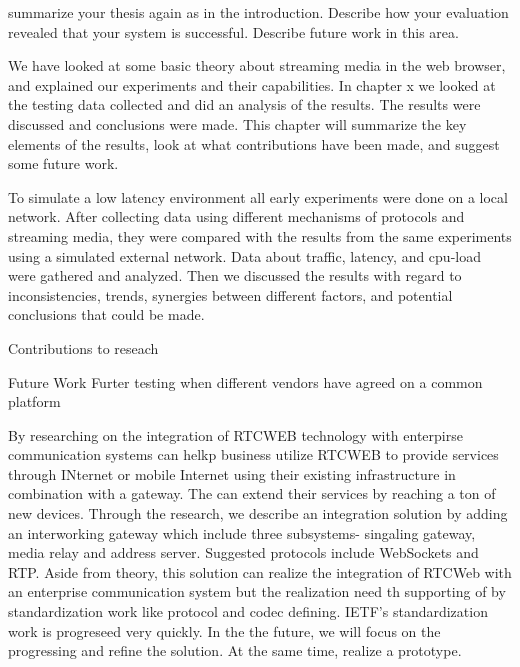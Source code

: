 
summarize your thesis again as in the introduction.
Describe how your evaluation revealed that your system is successful.
Describe future work in this area.

We have looked at some basic theory about streaming media in the web browser, and explained our experiments and their capabilities. In chapter x we looked at the testing data collected and did an analysis of the results. The results were discussed and conclusions were made. This chapter will summarize the key elements of the results, look at what contributions have been made, and suggest some future work.


To simulate a low latency environment all early experiments were done on a local network. After collecting data using different mechanisms of protocols and streaming media, they were compared with the results from the same experiments using a simulated external network. Data about traffic, latency, and cpu-load were gathered and analyzed. Then we discussed the results with regard to inconsistencies, trends, synergies between different factors, and potential conclusions that could be made.

Contributions to reseach

Future Work
Furter testing when different vendors have agreed on a common platform





By researching on the integration of RTCWEB technology with enterpirse communication systems can helkp business utilize RTCWEB to provide services through INternet or mobile Internet using their existing infrastructure in combination with a gateway. The can extend their services by reaching a ton of new devices. 
Through the research, we describe an integration solution by adding an interworking gateway which include three subsystems- singaling gateway, media relay and address server. Suggested protocols include WebSockets and RTP.
Aside from theory, this solution can realize the integration of RTCWeb with an enterprise communication system but the realization need th supporting of by standardization work like protocol and codec defining. IETF's standardization work is progreseed very quickly. In the the future, we will focus on the progressing and refine the solution. At the same time, realize a prototype.